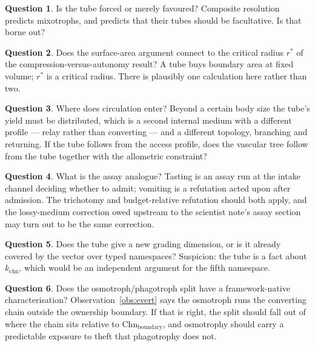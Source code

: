 \documentclass[11pt]{article}
\theoremstyle{plain}
\theoremstyle{definition}
\newtheorem{question}{Question}
\newcommand{\Chn}{\mathrm{Chn}}
\begin{document}
\begin{question}
Is the tube forced or merely favoured? Composite resolution predicts mixotrophs, and predicts that
their tubes should be facultative. Is that borne out?
\end{question}

\begin{question}
Does the surface-area argument connect to the critical radius $r^{*}$ of the compression-versus-autonomy
result? A tube buys boundary area at fixed volume; $r^{*}$ is a critical radius. There is plausibly one
calculation here rather than two.
\end{question}

\begin{question}
Where does circulation enter? Beyond a certain body size the tube's yield must be distributed, which is
a second internal medium with a different profile --- relay rather than converting --- and a different
topology, branching and returning. If the tube follows from the access profile, does the vascular tree
follow from the tube together with the allometric constraint?
\end{question}

\begin{question}
What is the assay analogue? Tasting is an assay run at the intake channel deciding whether to admit;
vomiting is a refutation acted upon after admission. The trichotomy and budget-relative refutation
should both apply, and the lossy-medium correction owed upstream to the scientist note's assay section
may turn out to be the same correction.
\end{question}

\begin{question}
Does the tube give a new grading dimension, or is it already covered by the vector over typed
namespaces? Suspicion: the tube is a fact about $k_{\mathrm{chn}}$, which would be an independent
argument for the fifth namespace.
\end{question}

\begin{question}
Does the osmotroph/phagotroph split have a framework-native characterisation? Observation~\ref{obs:evert}
says the osmotroph runs the converting chain outside the ownership boundary. If that is right, the
split should fall out of where the chain sits relative to $\Chn_{\mathrm{boundary}}$, and osmotrophy
should carry a predictable exposure to theft that phagotrophy does not.
\end{question}
\end{document}
